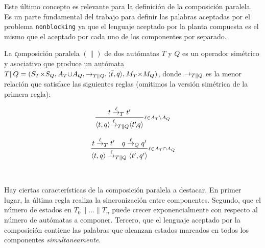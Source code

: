 Este último concepto es relevante para la definición de la composición paralela. Es un parte fundamental del trabajo para definir las palabras aceptadas por el problema \texttt{nonblocking} ya que el lenguaje aceptado por la planta compuesta es el mismo que el aceptado por cada uno de los componentes por separado.

\begin{definition}  \label{def:parcomp}
	La \k{composición paralela} $(\|)$ de dos autómatas $T$ y $Q$ es un operador simétrico y asociativo que produce un autómata $T \| Q = (S_T {\times} S_Q, A_T {\cup} 
	A_Q, \rightarrow_{T\|Q}, \langle\bar{t},\bar{q}\rangle, M_T {\times} M_Q)$, donde $\rightarrow_{T\|Q}$ es la menor relación que satisface las siguientes reglas (omitimos la versión simétrica de la primera regla):
	
	\begin{normalsize}
		\centering
		\vspace{-18pt}
		\hspace{-50pt}
		\begin{minipage}{0.30\linewidth}
			\[ 
			\frac{t \overset{\ell}{\rightarrow}_{T} t'}{\langle t,q\rangle {\overset{\ell}{\rightarrow}_{T\|Q}} \langle t'\!,\!q\rangle }{{\scriptstyle \ell \in A_{T} {\setminus} A_{Q}}} 
			\]
		\end{minipage} 
		\hspace{40pt}
		\begin{minipage}{0.30\linewidth}
			\[ 
			\frac{t \overset{\ell}{\rightarrow}_{T} t' \quad q \overset{\ell}{\rightarrow}_{Q} q'}{\langle t,q\rangle \overset{\ell}{\rightarrow}_{T\|Q} \langle t',q'\rangle}{{\scriptstyle \ell \in A_{T} {\cap} A_{Q}}}
			\]
		\end{minipage} \\[15pt]
	\end{normalsize}
\end{definition}

Hay ciertas características de la composición paralela a destacar. En primer lugar, la última regla realiza la sincronización entre componentes. Segundo, que el número de estados en $T_0 \| ... \| T_n$ puede crecer exponencialmente con respecto al número de autómatas a componer. Tercero, que el lenguaje aceptado por la composición contiene las palabras que alcanzan estados marcados en todos los componentes \textit{simultaneamente}.

